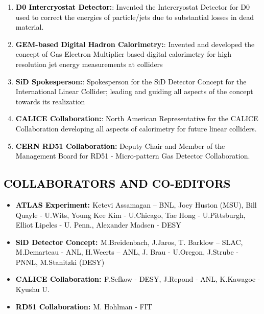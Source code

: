 \begin{enumerate}

\item {
\textbf{\textcolor{black}{D0 Intercryostat Detector:}}\textcolor{black}{: Invented the Intercryostat Detector for D0 used to 
correct the energies of particle/jets due to substantial losses in dead material. }}

\item {
\textbf{\textcolor{black}{GEM-based Digital Hadron Calorimetry:}}\textcolor{black}{: Invented and developed the concept of Gas Electron Multiplier
based digital calorimetry for high resolution jet energy measurements at colliders} }

\item {
\textbf{\textcolor{black}{SiD Spokesperson:}}\textcolor{black}{: Spokesperson for the SiD Detector Concept for the International 
Linear Collider; leading and guiding all aspects of the concept towards its realization}}

\item {
\textbf{\textcolor{black}{CALICE Collaboration:}}\textcolor{black}{: North American Representative for the CALICE Collaboration
developing all aspects of calorimetry for future linear colliders}.}

\item {
\textbf{\textcolor{black}{CERN RD51 Collaboration:}}\textcolor{black}{ Deputy Chair and Member of the Management Board for RD51
 - Micro-pattern Gas Detector Collaboration.}}
 
\end{enumerate}

\subsection[COLLABORATORS AND CO{}-EDITORS]{{\textcolor{black}{COLLABORATORS AND
CO-EDITOR}}\textcolor{black}{S}}
\begin{itemize}
\item {
\textbf{\textcolor{black}{ATLAS Experiment: }}\textcolor{black}{Ketevi Assamagan – BNL, Joey Huston (MSU), Bill Quayle - U.Wits, 
Young Kee Kim - U.Chicago, Tae Hong - U.Pittsburgh, Elliot Lipeles - U. Penn., Alexander Madsen - DESY }}

\item {
\textbf{\textcolor{black}{SiD Detector Concept: }}\textcolor{black}{M.Breidenbach, J.Jaros, T. Barklow – SLAC, M.Demarteau - ANL, 
H.Weerts – ANL, J. Brau - U.Oregon, J.Strube - PNNL, M.Stanitzki (DESY)}}

\item {
\textbf{\textcolor{black}{CALICE Collaboration: }}\textcolor{black}{F.Sefkow - DESY, J.Repond - ANL, K.Kawagoe - Kyushu U.}}

\item {
\textbf{\textcolor{black}{RD51 Collaboration: }}\textcolor{black}{M. Hohlman - FIT}}
\end{itemize}

